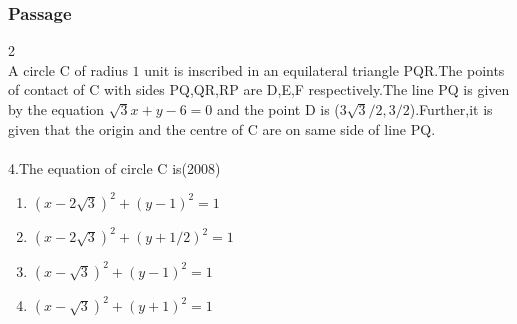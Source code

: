 \documentclass[journal,12pt,twocolumn]{IEEEtran}
\theoremstyle{remark}
\begin{document}
\subsubsection{Passage } 2\\
A circle C of radius $1$ unit is inscribed in an equilateral triangle PQR.The points of contact of C with sides PQ,QR,RP are D,E,F respectively.The line PQ is given by the equation $\sqrt{3}x+y-6=0$ and the point D is ($3\sqrt{3}/2, 3/2$).Further,it is given that the origin and the centre of C are on same side of line PQ.\\
\\
4.The equation of circle C is\hfill{(2008)}
\begin{enumerate}
\item $(x-2\sqrt{3})^2 + (y-1)^2=1$\\
\item $(x-2\sqrt{3})^2 + (y+1/2)^2=1$\\
\item $(x-\sqrt{3})^2 + (y-1)^2=1$\\
\item $(x-\sqrt{3})^2 + (y+1)^2=1$\\
\end{enumerate}
\end{document}
